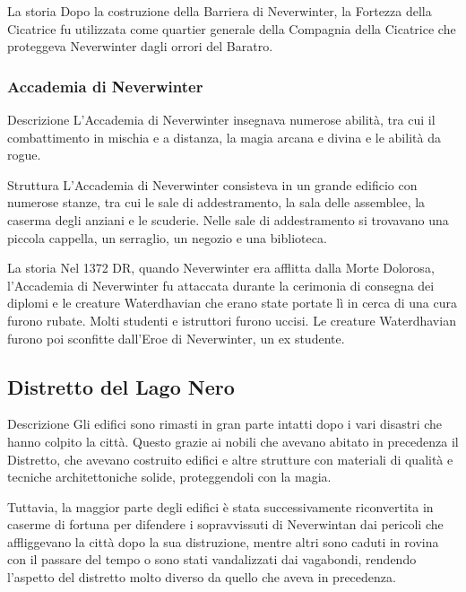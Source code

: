\documentclass{article}
\begin{document}
La storia
Dopo la costruzione della Barriera di Neverwinter, la Fortezza della Cicatrice fu utilizzata come quartier generale della Compagnia della Cicatrice che proteggeva Neverwinter dagli orrori del Baratro.
\subsubsection{Accademia di Neverwinter}
Descrizione
L'Accademia di Neverwinter insegnava numerose abilità, tra cui il combattimento in mischia e a distanza, la magia arcana e divina e le abilità da rogue.

Struttura
L'Accademia di Neverwinter consisteva in un grande edificio con numerose stanze, tra cui le sale di addestramento, la sala delle assemblee, la caserma degli anziani e le scuderie. Nelle sale di addestramento si trovavano una piccola cappella, un serraglio, un negozio e una biblioteca.

La storia
Nel 1372 DR, quando Neverwinter era afflitta dalla Morte Dolorosa, l'Accademia di Neverwinter fu attaccata durante la cerimonia di consegna dei diplomi e le creature Waterdhavian che erano state portate lì in cerca di una cura furono rubate. Molti studenti e istruttori furono uccisi. Le creature Waterdhavian furono poi sconfitte dall'Eroe di Neverwinter, un ex studente.
\subsection{Distretto del Lago Nero}
Descrizione
Gli edifici sono rimasti in gran parte intatti dopo i vari disastri che hanno colpito la città. Questo grazie ai nobili che avevano abitato in precedenza il Distretto, che avevano costruito edifici e altre strutture con materiali di qualità e tecniche architettoniche solide, proteggendoli con la magia.

Tuttavia, la maggior parte degli edifici è stata successivamente riconvertita in caserme di fortuna per difendere i sopravvissuti di Neverwintan dai pericoli che affliggevano la città dopo la sua distruzione, mentre altri sono caduti in rovina con il passare del tempo o sono stati vandalizzati dai vagabondi, rendendo l'aspetto del distretto molto diverso da quello che aveva in precedenza.
\end{document}
